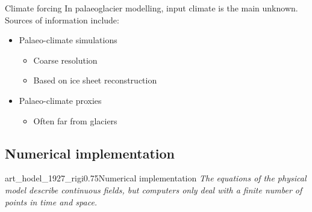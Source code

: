 
    \begin{frame}{Climate forcing}
      In palaeoglacier modelling, input climate is the main unknown.\\
      Sources of information include:\\\bigskip
      \begin{itemize}
        \item Palaeo-climate simulations
          \begin{itemize}
            \item Coarse resolution
            \item Based on ice sheet reconstruction
          \end{itemize}
        \item Palaeo-climate proxies
          \begin{itemize}
            \item Often far from glaciers
          \end{itemize}
      \end{itemize}
    \end{frame}


\subsection{Numerical implementation}

    \begin{sectionframe}{art_hodel_1927_rigi}{0.75}{Numerical implementation}
      \emph{The equations of the physical model describe \alert{continuous}
        fields, but computers only deal with a \alert{finite number of points}
        in time and space.}
    \end{sectionframe}

